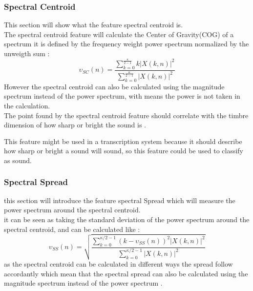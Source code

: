 \subsubsection{Spectral Centroid}
This section will show what the feature spectral centroid is.\\
The spectral centroid feature will calculate the Center of Gravity(COG) of a spectrum it is defined by the frequency weight power spectrum normalized by the unweigth sum \citep{ACA}:
\begin{equation}\label{Spectral Centroid eq}
	\upsilon_{SC}(n) = \frac{\displaystyle\sum_{k = 0}^{\frac{\kappa}{2-1}} k\vert X(k,n) \vert^2}{\displaystyle\sum_{k = 0}^{\frac{\kappa}{2-1}} \vert X(k,n) \vert^2 }    
\end{equation} 
However the spectral centroid can also be calculated using the magnitude spectrum instead of the power spectrum, with means the power is not taken in the calculation\citep{ACA}.
\\
The point found by the spectral centroid feature should correlate with the timbre dimension of how sharp or bright the sound is \citep{ACA}. 

This feature might be used in a transcription system because it should describe how sharp or bright a sound will sound, so this feature could be used to classify as sound.

\subsubsection{Spectral Spread}
this section will introduce the feature spectral Spread which will measure the power spectrum around the spectral centroid.\\
it can be seen as taking the standard deviation of the power spectrum around the spectral centroid, and can be calculated like \citep{ACA}:
\begin{equation}
	\upsilon_{SS}(n)=\sqrt{\frac{\sum_{k = 0}^{\kappa/2-1}(k-\upsilon_{SS}(n))^2\vert X(k,n)\vert^2}{\sum_{k = 0}^{\kappa/2-1}\vert X(k,n)\vert^2}}
\end{equation}
as the spectral centroid can be calculated in different ways the spread follow accordantly which mean that the spectral spread can also be calculated using the magnitude spectrum instead of the power spectrum \citep{ACA}.

